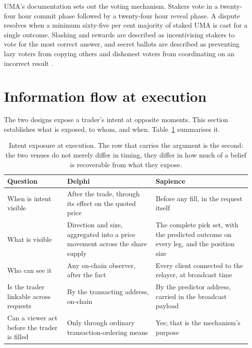 UMA's documentation sets out the voting mechanism. Stakers vote in a twenty-four hour commit
phase followed by a twenty-four hour reveal phase. A dispute resolves when a minimum
sixty-five per cent majority of staked UMA is cast for a single outcome. Slashing and
rewards are described as incentivising stakers to vote for the most correct answer, and
secret ballots are described as preventing lazy voters from copying others and dishonest
voters from coordinating on an incorrect result \cite{uma2026oracle}.

\section{Information flow at execution}
\label{sec:execflow}

The two designs expose a trader's intent at opposite moments. This section establishes what
is exposed, to whom, and when. Table~\ref{tab:execflow} summarises it.

\begin{table}[htbp]
\centering
\begin{tabularx}{\textwidth}{p{}p{}X}
\toprule
\textbf{Question} & \textbf{Delphi} & \textbf{Sapience} \\
\midrule
When is intent visible & After the trade, through its effect on the quoted price & Before any fill, in the request itself \\
What is visible & Direction and size, aggregated into a price movement across the share supply & The complete pick set, with the predicted outcome on every leg, and the position size \\
Who can see it & Any on-chain observer, after the fact & Every client connected to the relayer, at broadcast time \\
Is the trader linkable across requests & By the transacting address, on-chain & By the predictor address, carried in the broadcast payload \\
Can a viewer act before the trader is filled & Only through ordinary transaction-ordering means & Yes; that is the mechanism's purpose \\
\bottomrule
\end{tabularx}
\caption{Intent exposure at execution. The row that carries the argument is the second: the
two venues do not merely differ in timing, they differ in how much of a belief is
recoverable from what they expose.}
\label{tab:execflow}
\end{table}

